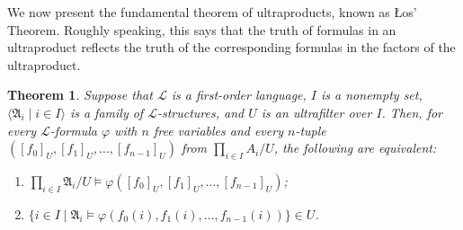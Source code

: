 \documentclass[a4paper]{memoir}
\newtheorem{theorem}{Theorem}[section]
\theoremstyle{definition}
\newcommand{\mc}{\mathcal}
\begin{document}
We now present the fundamental theorem of ultraproducts, known as \L os' Theorem. Roughly speaking, 
this says that the truth of formulas in an ultraproduct reflects the truth of the corresponding 
formulas in the factors of the ultraproduct.

\begin{theorem} \label{thm: los}
  Suppose that $\mc{L}$ is a first-order language, $I$ is a nonempty set, $\langle \mathfrak{A}_i 
  \mid i \in I \rangle$ is a family of $\mc{L}$-structures, and $U$ is an ultrafilter over 
  $I$. Then, for every $\mc{L}$-formula $\varphi$ with $n$ free variables and every 
  $n$-tuple $([f_0]_U, [f_1]_U, \ldots, [f_{n-1}]_U)$ from $\prod_{i \in I} A_i /U$, 
  the following are equivalent:
  \begin{enumerate}
    \item $\prod_{i \in I} \mathfrak{A}_i/U \models \varphi([f_0]_U, [f_1]_U, \ldots, [f_{n-1}]_U)$;
    \item $\{i \in I \mid \mathfrak{A}_i \models \varphi(f_0(i), f_1(i), \ldots, f_{n-1}(i))\} \in U$.
  \end{enumerate}
\end{theorem}
\end{document}
